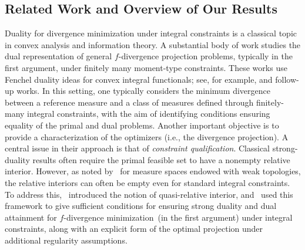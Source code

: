 \documentclass{article}
\theoremstyle{plain}
\theoremstyle{definition}
\begin{document}
\subsection{Related Work and Overview of Our Results}
Duality for divergence minimization under integral constraints is a classical topic in convex analysis and information theory. A substantial body of work studies  the dual representation of general $f$-divergence  projection problems, typically in the first argument, under finitely many moment-type constraints. These works use  Fenchel duality ideas for convex integral functionals; see, for example, \citet{broniatowski2006minimization, broniatowski2012divergences, borwein1991duality} and follow-up works.  In this setting, one typically considers the minimum divergence between a reference measure and a class of measures defined through finitely-many integral constraints, with the aim of  identifying conditions ensuring equality of the primal and dual problems. Another important objective is to provide a characterization of the optimizers (i.e., the divergence projection). A central issue in their approach is that of \emph{constraint qualification}. Classical strong-duality results often require the primal feasible set to have a nonempty relative interior. However, as noted by~\citet{borwein1992partially} for measure spaces endowed with weak topologies, the relative interiors can often be empty even for standard integral constraints. To address this,~\citet[Definition 2.3]{borwein1992partially} introduced the notion of quasi-relative interior, and~\citet[Theorem 1.1]{broniatowski2006minimization} used this framework to give sufficient conditions for ensuring strong duality and dual attainment for $f$-divergence minimization~(in the first argument) under integral constraints, along with an explicit form of the optimal projection under additional regularity assumptions. 
\end{document}

